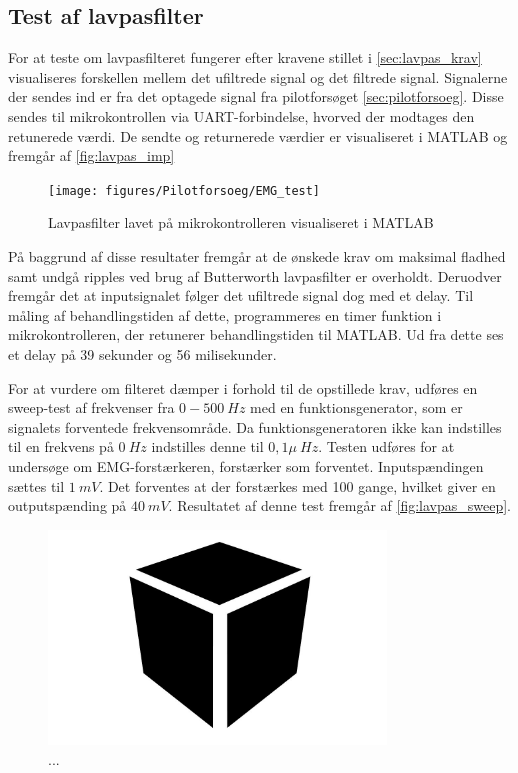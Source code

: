 \subsection{Test af lavpasfilter}
For at teste om lavpasfilteret fungerer efter kravene stillet i \autoref{sec:lavpas_krav} visualiseres forskellen mellem det ufiltrede signal og det filtrede signal. Signalerne der sendes ind er fra det optagede signal fra pilotforsøget \autoref{sec:pilotforsoeg}. Disse sendes til mikrokontrollen via UART-forbindelse, hvorved der modtages den retunerede værdi. De sendte og returnerede værdier er visualiseret i MATLAB og fremgår af \autoref{fig:lavpas_imp}

\begin{figure}[H]
\centering
\texttt{[image: figures/Pilotforsoeg/EMG\_test]}
\caption{Lavpasfilter lavet på mikrokontrolleren visualiseret i MATLAB}
\label{fig:lavpas_imp}
\end{figure}

På baggrund af disse resultater fremgår at de ønskede krav om maksimal fladhed samt undgå ripples ved brug af Butterworth lavpasfilter er overholdt. 
Deruodver fremgår det at inputsignalet følger det ufiltrede signal dog med et delay. Til måling af behandlingstiden af dette, programmeres en timer funktion i mikrokontrolleren, der retunerer behandlingstiden til MATLAB. Ud fra dette ses et delay på 39 sekunder og 56 milisekunder.


For at vurdere om filteret dæmper i forhold til de opstillede krav, udføres en sweep-test af frekvenser fra $0-500~Hz$ med en funktionsgenerator, som er signalets forventede frekvensområde. Da funktionsgeneratoren ikke kan indstilles til en frekvens på $0~Hz$ indstilles denne til $0,1 \mu~Hz$. Testen udføres for at undersøge om EMG-forstærkeren, forstærker som forventet. Inputspændingen sættes til $1~mV$. Det forventes at der forstærkes med 100 gange, hvilket giver en outputspænding på $40~mV$. Resultatet af denne test fremgår af \autoref{fig:lavpas_sweep}. 


\begin{figure}[H]
\centering
\includegraphics[width=0.8\textwidth]{figures/Pilotforsoeg/blackbox}
\caption{...}
\label{fig:lavps_sweep}
\end{figure}


